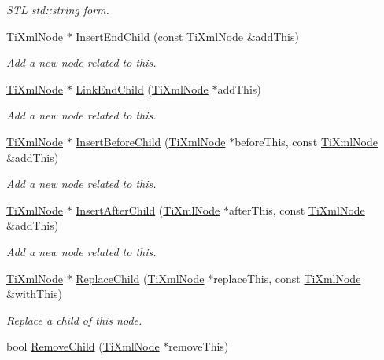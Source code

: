 \begin{DoxyCompactItemize}
\begin{DoxyCompactList}\small\item\em S\+TL std\+::string form. \end{DoxyCompactList}\item 
\hyperlink{class_ti_xml_node}{Ti\+Xml\+Node} $\ast$ \hyperlink{class_ti_xml_node_af287a913ce46d8dbf7ef24fec69bbaf0}{Insert\+End\+Child} (const \hyperlink{class_ti_xml_node}{Ti\+Xml\+Node} \&add\+This)
\begin{DoxyCompactList}\small\item\em Add a new node related to this. \end{DoxyCompactList}\item 
\hyperlink{class_ti_xml_node}{Ti\+Xml\+Node} $\ast$ \hyperlink{class_ti_xml_node_a1a881212554b759865f6cac79a851d38}{Link\+End\+Child} (\hyperlink{class_ti_xml_node}{Ti\+Xml\+Node} $\ast$add\+This)
\begin{DoxyCompactList}\small\item\em Add a new node related to this. \end{DoxyCompactList}\item 
\hyperlink{class_ti_xml_node}{Ti\+Xml\+Node} $\ast$ \hyperlink{class_ti_xml_node_a71e54e393336382bc9875f64aab5cb15}{Insert\+Before\+Child} (\hyperlink{class_ti_xml_node}{Ti\+Xml\+Node} $\ast$before\+This, const \hyperlink{class_ti_xml_node}{Ti\+Xml\+Node} \&add\+This)
\begin{DoxyCompactList}\small\item\em Add a new node related to this. \end{DoxyCompactList}\item 
\hyperlink{class_ti_xml_node}{Ti\+Xml\+Node} $\ast$ \hyperlink{class_ti_xml_node_a274db3292218202805c093f66a964cb5}{Insert\+After\+Child} (\hyperlink{class_ti_xml_node}{Ti\+Xml\+Node} $\ast$after\+This, const \hyperlink{class_ti_xml_node}{Ti\+Xml\+Node} \&add\+This)
\begin{DoxyCompactList}\small\item\em Add a new node related to this. \end{DoxyCompactList}\item 
\hyperlink{class_ti_xml_node}{Ti\+Xml\+Node} $\ast$ \hyperlink{class_ti_xml_node_a543208c2c801c84a213529541e904b9f}{Replace\+Child} (\hyperlink{class_ti_xml_node}{Ti\+Xml\+Node} $\ast$replace\+This, const \hyperlink{class_ti_xml_node}{Ti\+Xml\+Node} \&with\+This)
\begin{DoxyCompactList}\small\item\em Replace a child of this node. \end{DoxyCompactList}\item 
bool \hyperlink{class_ti_xml_node_ae19d8510efc90596552f4feeac9a8fbf}{Remove\+Child} (\hyperlink{class_ti_xml_node}{Ti\+Xml\+Node} $\ast$remove\+This)\hypertarget{class_ti_xml_node_ae19d8510efc90596552f4feeac9a8fbf}{}\label{class_ti_xml_node_ae19d8510efc90596552f4feeac9a8fbf}


\end{DoxyCompactItemize}

